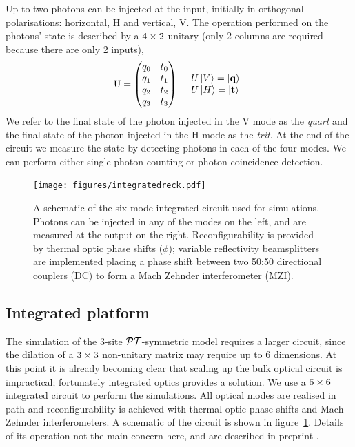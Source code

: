 Up to two photons can be injected at the input, initially in orthogonal
polarisations: horizontal, H and vertical, V. The operation performed on the
photons' state is described by a \(4 \times 2\) unitary (only 2 columns are
required because there are only 2 inputs),
\begin{align}
  \mathrm{U} = \begin{pmatrix}
    q_{0} & t_{0} \\
    q_{1} & t_{1} \\
    q_{2} & t_{2} \\
    q_{3} & t_{3}
  \end{pmatrix} && \begin{array}{l}
    U \left|V\right\rangle = \left|\mathbf{q}\right\rangle \\
    U \left|H\right\rangle = \left|\mathbf{t}\right\rangle
  \end{array}
\end{align}
We refer to the final state of the photon injected in the V mode as
the \emph{quart} and the final state of the photon injected in the H
mode as the \emph{trit}. At the end of the circuit we measure the state by
detecting photons in each of the four modes. We can perform either single photon
counting or photon coincidence detection.

\begin{figure}[h]
  \centering
  \texttt{[image: figures/integratedreck.pdf]}
  \caption[A schematic of the integrated circuit used for simulations]
  {A schematic of the six-mode integrated circuit used for simulations. Photons
  can be injected in any of the modes on the left, and are measured at the
  output on the right. Reconfigurability is provided by thermal optic phase
  shifts (\(\phi\)); variable reflectivity beamsplitters are implemented placing
  a phase shift between two 50:50 directional couplers (DC) to form a Mach
  Zehnder interferometer (MZI).}
  \label{fig:IC}
\end{figure}

\subsection{Integrated platform}
The simulation of the 3-site \(\mathcal{PT}\)-symmetric model requires a larger circuit,
since the dilation of a \(3 \times 3\) non-unitary matrix may require up to 6
dimensions. At this point it is already becoming clear that scaling up the bulk
optical circuit is impractical; fortunately integrated optics provides a
solution. We use a \(6 \times 6\) integrated circuit to perform the simulations.
All optical modes are realised in path and reconfigurability is achieved with
thermal optic phase shifts and Mach Zehnder interferometers. A schematic of the
circuit is shown in figure~\ref{fig:IC}. Details of its operation not the main
concern here, and are described in preprint \cite{bigreck}.

